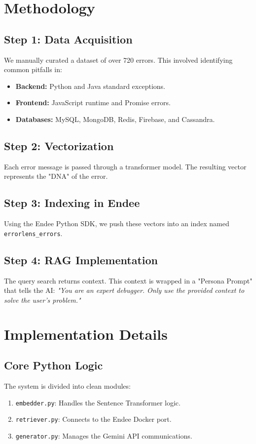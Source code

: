 \documentclass[12pt,a4paper]{report}
\begin{document}
\chapter{Methodology}
\section{Step 1: Data Acquisition}
We manually curated a dataset of over 720 errors. This involved identifying common pitfalls in:
\begin{itemize}
    \item \textbf{Backend:} Python and Java standard exceptions.
    \item \textbf{Frontend:} JavaScript runtime and Promise errors.
    \item \textbf{Databases:} MySQL, MongoDB, Redis, Firebase, and Cassandra.
\end{itemize}

\section{Step 2: Vectorization}
Each error message is passed through a transformer model. The resulting vector represents the "DNA" of the error.

\section{Step 3: Indexing in Endee}
Using the Endee Python SDK, we push these vectors into an index named \texttt{errorlens\_errors}.

\section{Step 4: RAG Implementation}
The query search returns context. This context is wrapped in a "Persona Prompt" that tells the AI: \textit{"You are an expert debugger. Only use the provided context to solve the user's problem."}

\chapter{Implementation Details}
\section{Core Python Logic}
The system is divided into clean modules:
\begin{enumerate}
    \item \texttt{embedder.py}: Handles the Sentence Transformer logic.
    \item \texttt{retriever.py}: Connects to the Endee Docker port.
    \item \texttt{generator.py}: Manages the Gemini API communications.
\end{enumerate}
\end{document}
